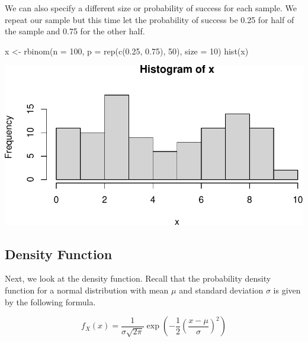 \documentclass[
  letterpaper,
]{latex/krantz}
\makeatletter
\newenvironment{Shaded}{\begin{snugshade}}{\end{snugshade}}
\newcommand{\AttributeTok}[1]{\textcolor[rgb]{0.40,0.45,0.13}{#1}}
\newcommand{\DecValTok}[1]{\textcolor[rgb]{0.68,0.00,0.00}{#1}}
\newcommand{\FloatTok}[1]{\textcolor[rgb]{0.68,0.00,0.00}{#1}}
\newcommand{\FunctionTok}[1]{\textcolor[rgb]{0.28,0.35,0.67}{#1}}
\newcommand{\NormalTok}[1]{\textcolor[rgb]{0.00,0.23,0.31}{#1}}
\newcommand{\OtherTok}[1]{\textcolor[rgb]{0.00,0.23,0.31}{#1}}
\newenvironment{kframe}{%
\medskip{}
\setlength{\fboxsep}{.8em}
 \def\at@end@of@kframe{}%
 \ifinner\ifhmode%
  \def\at@end@of@kframe{\end{minipage}}%
  \begin{minipage}{\columnwidth}%
 \fi\fi%
 \def\FrameCommand##1{\hskip\@totalleftmargin \hskip-\fboxsep
 \colorbox{shadecolor}{##1}\hskip-\fboxsep
     \hskip-\linewidth \hskip-\@totalleftmargin \hskip\columnwidth}%
 \MakeFramed {\advance\hsize-\width
   \@totalleftmargin\z@ \linewidth\hsize
   \@setminipage}}%
 {\par\unskip\endMakeFramed%
 \at@end@of@kframe}
\renewenvironment{Shaded}{\begin{kframe}}{\end{kframe}}
\makeatother
\begin{document}
We can also specify a different size or probability of success for each
sample. We repeat our sample but this time let the probability of
success be 0.25 for half of the sample and 0.75 for the other half.

\begin{Shaded}
\begin{Highlighting}[]
\NormalTok{x }\OtherTok{\textless{}{-}} \FunctionTok{rbinom}\NormalTok{(}\AttributeTok{n =} \DecValTok{100}\NormalTok{, }\AttributeTok{p =} \FunctionTok{rep}\NormalTok{(}\FunctionTok{c}\NormalTok{(}\FloatTok{0.25}\NormalTok{, }\FloatTok{0.75}\NormalTok{), }\DecValTok{50}\NormalTok{), }\AttributeTok{size =} \DecValTok{10}\NormalTok{)}
\FunctionTok{hist}\NormalTok{(x)}
\end{Highlighting}
\end{Shaded}

\begin{center}
\includegraphics[width=1\textwidth,height=\textheight]{book/distributions_files/figure-pdf/unnamed-chunk-7-1.pdf}
\end{center}

\subsection{\texorpdfstring{Density Function
}{Density Function   }}\label{density-function}

Next, we look at the density function. Recall that the probability
density function for a normal distribution with mean \(\mu\) and
standard deviation \(\sigma\) is given by the following formula.

\[ f_X(x) = \frac{1}{\sigma \sqrt{2 \pi}} \exp \left(-\frac{1}{2} \left (\frac{x-\mu}{\sigma} \right)^2 \right) \]
\end{document}
